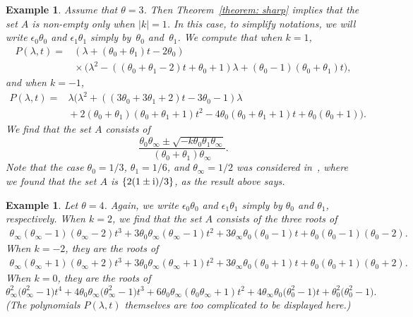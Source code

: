 \documentclass[pdftex]{sigma}
\numberwithin{equation}{section}
\newtheorem{Example}[Theorem]{Example}
\begin{document}
\begin{Example}\label{example2} Assume that $\theta=3$. Then Theorem~\ref{theorem: sharp} implies that the set $A$ is non-empty
 only when $|k|=1$. In this case,
 to simplify notations, we will write $\epsilon_0\theta_0$ and
 $\epsilon_1\theta_1$ simply by~$\theta_0$ and~$\theta_1$. We compute
 that when $k=1$,
 \begin{align*}
 P(\lambda,t)={}&(\lambda+(\theta_0+\theta_1)t-2\theta_0) \\
 &{}\times\bigl(\lambda^2-((\theta_0+\theta_1-2)t+\theta_0+1)\lambda
 +(\theta_0-1)(\theta_0+\theta_1)t\bigr),
 \end{align*}
 and when $k=-1$,
 \begin{align*}
 P(\lambda,t)={}&\lambda\bigl(\lambda^2+((3\theta_0+3\theta_1+2)t
 -3\theta_0-1)\lambda \\
 &{}+2(\theta_0+\theta_1)(\theta_0+\theta_1+1)t^2
 -4\theta_0(\theta_0+\theta_1+1)t+\theta_0(\theta_0+1)\bigr).
 \end{align*}
 We find that the set $A$ consists of
\[
 \frac{\theta_0\theta_\infty
 \pm\sqrt{-k\theta_0\theta_1\theta_\infty}}
 {(\theta_0+\theta_1)\theta_\infty}.
\]
 Note that the case $\theta_0=1/3$, $\theta_1=1/6$, and
 $\theta_\infty=1/2$ was considered in~\cite[Example~5.6]{Chen-Lin-Yang}, where we found that the set $A$ is $\{2(1\pm
{\rm i})/3\}$, as the result above says.
\end{Example}

\begin{Example} Let $\theta=4$. Again, we write $\epsilon_0\theta_0$
 and $\epsilon_1\theta_1$ simply by $\theta_0$ and $\theta_1$,
 respectively. When $k=2$, we find that the set
 $A$ consists of the three roots of
 \begin{equation*}
 \begin{split}
 \theta_\infty(\theta_\infty-1)(\theta_\infty-2)t^3
 +3\theta_0\theta_\infty(\theta_\infty-1)t^2
 +3\theta_\infty\theta_0(\theta_0-1)t
 +\theta_0(\theta_0-1)(\theta_0-2).
 \end{split}
 \end{equation*}
 When $k=-2$, they are the roots of
 \begin{equation*}
 \begin{split}
 \theta_\infty(\theta_\infty+1)(\theta_\infty+2)t^3
 +3\theta_0\theta_\infty(\theta_\infty+1)t^2
 +3\theta_\infty\theta_0(\theta_0+1)t
 +\theta_0(\theta_0+1)(\theta_0+2).
 \end{split}
 \end{equation*}
 When $k=0$, they are the roots of
 $$
 \theta_\infty^2\bigl(\theta_\infty^2-1\bigr)t^4
 +4\theta_0\theta_\infty\bigl(\theta_\infty^2-1\bigr)t^3
 +6\theta_0\theta_\infty(\theta_0\theta_\infty+1)t^2
 +4\theta_\infty\theta_0\bigl(\theta_0^2-1\bigr)t
 +\theta_0^2\bigl(\theta_0^2-1\bigr).
 $$
 (The polynomials $P(\lambda,t)$ themselves are too complicated to be
 displayed here.)
\end{Example}
\end{document}
